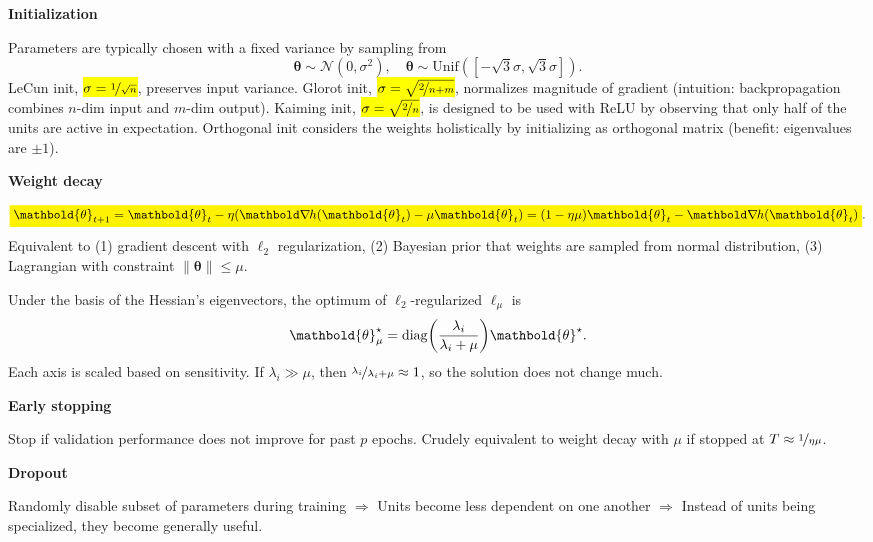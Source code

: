 \documentclass[10pt]{article}
\newenvironment{topic}[1]
{\textbf{\sffamily \footnotesize \colorbox{black}{\rlap{\textbf{\textcolor{white}{#1}}}\hspace{\linewidth}\hspace{-2\fboxsep}}}}
{}
\newenvironment{subtopic}[1]
{\begin{center}\textbf{\footnotesize \sffamily #1}\end{center}}
{}
\renewcommand{\vec}[1]{\ensuremath{\mathbold{#1}}}
\begin{document}
\begin{multicols*}{3}
\begin{topic}{Tricks of the trade}
        \begin{subtopic}{Initialization}
            Parameters are typically chosen with a fixed variance by sampling from \[
                \vec{\theta} \sim \mathcal{N}(0, \sigma^2), \quad \vec{\theta} \sim \mathrm{Unif}([-\sqrt{3}\sigma,\sqrt{3}\sigma]).
            \]
            LeCun init, \hl{$\sigma = \nicefrac{1}{\sqrt{n}}$}, preserves input variance. Glorot init, \hl{$\sigma =
            \sqrt{\nicefrac{2}{n+m}}$}, normalizes magnitude of gradient (intuition: backpropagation combines
            $n$-dim input and $m$-dim output). Kaiming init, \hl{$\sigma = \sqrt{\nicefrac{2}{n}}$}, is designed to
            be used with ReLU by observing that only half of the units are active in expectation. Orthogonal
            init considers the weights holistically by initializing as orthogonal matrix (benefit: eigenvalues
            are $\pm 1$).
        \end{subtopic}

        \begin{subtopic}{Weight decay}
            \[
                \colorbox{yellow}{$\displaystyle \vec{\theta}_{t+1} = \vec{\theta}_t - \eta (\grad{h(\vec{\theta}_t)}{} - \mu \vec{\theta}_t) = (1-\eta \mu) \vec{\theta}_t - \grad{h(\vec{\theta}_t)}{}$}.
            \]
            Equivalent to (1) gradient descent with $\ell_2$ regularization, (2) Bayesian prior that weights
            are sampled from normal distribution, (3) Lagrangian with constraint $\| \vec{\theta} \| \leq \mu$.

            Under the basis of the Hessian's eigenvectors, the optimum of $\ell_2$-regularized $\ell_{\mu}$ is \[
                \vec{\theta}_\mu^\star = \mathrm{diag}\lft( \frac{\lambda_i}{\lambda_i + \mu} \rgt) \vec{\theta}^\star.
            \]
            Each axis is scaled based on sensitivity. If $\lambda_i \gg \mu$, then
            $\nicefrac{\lambda_i}{\lambda_i + \mu} \approx 1$, so the solution does not change much.
        \end{subtopic}

        \begin{subtopic}{Early stopping}
            Stop if validation performance does not improve for past $p$ epochs. Crudely
            equivalent to weight decay with $\mu$ if stopped at $T \approx \nicefrac{1}{\eta \mu}$.
        \end{subtopic}

        \begin{subtopic}{Dropout}
            Randomly disable subset of parameters during training $\Rightarrow$ Units become less dependent
            on one another $\Rightarrow$ Instead of units being specialized, they become generally useful.


\end{subtopic}
\end{topic}
\end{multicols*}
\end{document}
